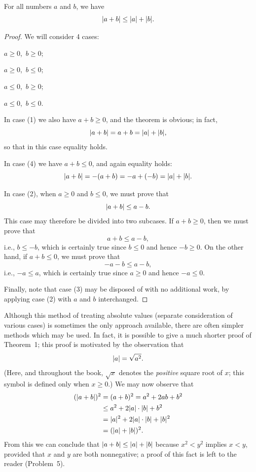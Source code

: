 \begin{theorem}
For all numbers $a$ and $b$, we have
\[ \lvert a+b\rvert \leq \lvert a\rvert + \lvert b\rvert. \]
\end{theorem}

\begin{proof}
We will consider 4 cases:
\begin{steps}
\item $a \geq 0$,\ $b \geq 0$;
\item $a \geq 0$,\ $b \leq 0$;
\item $a \leq 0$,\ $b \geq 0$;
\item $a \leq 0$,\ $b \leq 0$.
\end{steps}
In case (1) we also have $a+b \geq 0$, and the theorem is obvious; in fact,
\[ \lvert a+b\rvert = a+b = \lvert a\rvert+\lvert b\rvert, \]
so that in this case equality holds.

In case (4) we have $a+b \leq 0$, and again equality holds:
\[ \lvert a+b\rvert = -(a+b) = -a+(-b) = \lvert a\rvert+\lvert b\rvert. \]

In case (2), when $a \geq 0$ and $b \leq 0$, we must prove that
\[ \lvert a+b\rvert \leq a - b. \]
This case may therefore be divided into two subcases. If $a+b \geq 0$, then we
must prove that
\[ a+b \leq a-b, \]
i.e., $b \leq -b$, which is certainly true since $b \leq 0$ and hence
$-b \geq 0$. On the other hand, if $a+b \leq 0$, we must prove that
\[ -a-b \leq a-b, \]
i.e., $-a \leq a$, which is certainly true since $a \geq 0$ and hence
$-a \leq 0$.

Finally, note that case (3) may be disposed of with no additional work, by
applying case (2) with $a$ and $b$ interchanged.
\end{proof}

Although this method of treating absolute values (separate consideration of
various cases) is sometimes the only approach available, there are often
simpler methods which may be used. In fact, it is possible to give a much
shorter proof of Theorem~1; this proof is motivated by the observation that
\[ \lvert a\rvert = \sqrt{a^2}. \]
(Here, and throughout the book, $\sqrt{x}$ denotes the \emph{positive} square
root of $x$; this symbol is defined only when $x \geq 0$.) We may now observe
that
\begin{align*}
(\lvert a+b\rvert)^2 &= (a+b)^2 = a^2 + 2ab + b^2\\
&\leq a^2 + 2\lvert a\rvert \cdot \lvert b\rvert + b^2\\
&= \lvert a\rvert^2 + 2\lvert a\rvert \cdot \lvert b\rvert + \lvert b\rvert^2\\
&= (\lvert a\rvert+\lvert b\rvert)^2.
\end{align*}
From this we can conclude that $\lvert a+b\rvert \leq \lvert a\rvert+\lvert b\rvert$ because
$x^2 < y^2$ implies $x < y$, provided that $x$ and $y$ are both nonnegative;
a proof of this fact is left to the reader (Problem~5).

